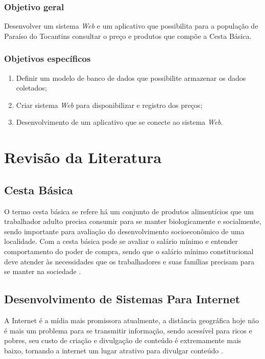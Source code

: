 \documentclass{ifto-tex}
\begin{document}
		\subsection{Objetivo geral}
		
			Desenvolver um sistema \textit{Web} e um aplicativo que possibilita para a população de Paraíso do Tocantins consultar o preço e produtos que compõe a Cesta Básica.
		
		\subsection{Objetivos específicos}
		
			\begin{enumerate}
						\item Definir um modelo de banco de dados que possibilite armazenar os dados coletados;
			\item Criar sistema \textit{Web} para disponibilizar e registro dos preços;
			\item Desenvolvimento de um aplicativo que se conecte ao sistema \textit{Web}.
			\end{enumerate}

\chapter{Revisão da Literatura}
	
	\section{Cesta Básica}
O termo cesta básica se refere há um conjunto de produtos alimentícios que um trabalhador adulto precisa consumir para se manter biologicamente e socialmente, sendo importante para avaliação do desenvolvimento socioeconômico de uma localidade. Com a cesta básica pode se avaliar o salário mínimo e entender comportamento do poder de compra, sendo que o salário mínimo constitucional deve atender às necessidades que os trabalhadores e suas famílias precisam para se manter na sociedade \cite{araujo2007impacto}.

\section{Desenvolvimento de Sistemas Para Internet}
A Internet é a mídia mais promissora atualmente, a distância geográfica hoje não é mais um problema para se transmitir informação, sendo acessível para ricos e pobres, seu custo de criação e divulgação de conteúdo é extremamente mais baixo, tornando a internet um lugar atrativo para divulgar conteúdo \cite{moran1997utilizar}.
\end{document}

